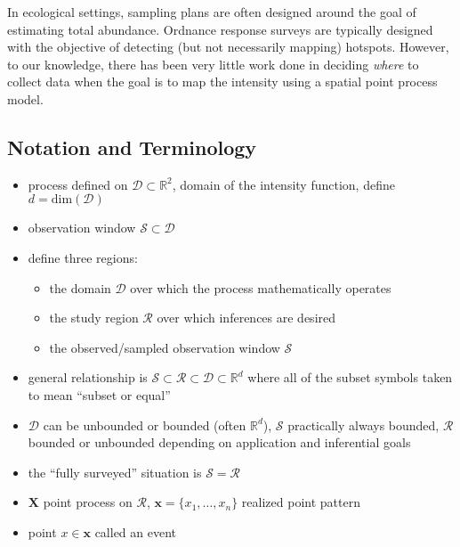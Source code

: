 \documentclass[12pt]{article}
\begin{document}
In ecological settings, sampling plans are often designed around the goal of
estimating total abundance. Ordnance response surveys are typically designed
with the objective of detecting (but not necessarily mapping) hotspots.
However, to our knowledge, there has been very little work done in deciding
\emph{where} to collect data when the goal is to map the intensity using a
spatial point process model.


\subsection{Notation and Terminology}

\begin{itemize}

\item process defined on \(\mathcal{D} \subset \mathbb{R}^{2}\), domain of the
intensity function, define \(d = \mathrm{dim}(\mathcal{D})\)

\item observation window \(\mathcal{S} \subset \mathcal{D}\)

\item define three regions:
\begin{itemize}
\item the domain \(\mathcal{D}\) over which the process mathematically operates
\item the study region \(\mathcal{R}\) over which inferences are desired
\item the observed/sampled observation window \(\mathcal{S}\)
\end{itemize}

\item general relationship is \(\mathcal{S} \subset \mathcal{R}
\subset \mathcal{D} \subset \mathbb{R}^{d}\) where all of the subset symbols
taken to mean ``subset or equal''

\item \(\mathcal{D}\) can be unbounded or bounded (often \(\mathbb{R}^{d}\)),
$\mathcal{S}$ practically always bounded, \(\mathcal{R}\) bounded or unbounded
depending on application and inferential goals

\item the ``fully surveyed'' situation is \(\mathcal{S} = \mathcal{R}\)

\item \(\mathbf{X}\) point process on \(\mathcal{R}\), \(\mathbf{x} = \{x_{1},
\dots, x_{n}\}\) realized point pattern

\item point \(x \in \mathbf{x}\) called an event


\end{itemize}
\end{document}
